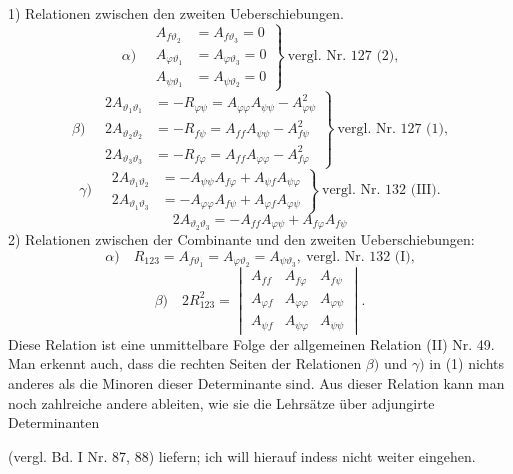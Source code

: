 1) Relationen zwischen den zweiten Ueberschiebungen.
\[
\alpha)\quad
\left.\begin{aligned}
A_{f\vartheta_2} &= A_{f\vartheta_3} = 0\\
A_{\varphi\vartheta_1} &= A_{\varphi\vartheta_3} = 0\\
A_{\psi\vartheta_1} &= A_{\psi\vartheta_2} = 0 %
\end{aligned}\right\}\ \text{vergl. Nr. 127 (2),}
\]
\[
\beta)\quad
\left.\begin{aligned}
2A_{\vartheta_1\vartheta_1} &= -R_{\varphi\psi} = A_{\varphi\varphi}A_{\psi\psi}-A_{\varphi\psi}^2\\
2A_{\vartheta_2\vartheta_2} &= -R_{f\psi} = A_{ff}A_{\psi\psi}-A_{f\psi}^2\\
2A_{\vartheta_3\vartheta_3} &= -R_{f\varphi} = A_{ff}A_{\varphi\varphi}-A_{f\varphi}^2
\end{aligned}\right\}\ \text{vergl. Nr. 127 (1),}
\]
\[
\gamma)\quad
\left.\begin{aligned}
2A_{\vartheta_1\vartheta_2} &= -A_{\psi\psi}A_{f\varphi}+A_{\psi f}A_{\psi\varphi}\\
2A_{\vartheta_1\vartheta_3} &= -A_{\varphi\varphi}A_{f\psi}+A_{\varphi f}A_{\varphi\psi}
\end{aligned}\right\}\ \text{vergl. Nr. 132 (III).}
\]
\[
2A_{\vartheta_2\vartheta_3} = -A_{ff}A_{\varphi\psi}+A_{f\varphi}A_{f\psi}
\]
2) Relationen zwischen der Combinante und den zweiten Ueberschiebungen:
\[
\alpha)\quad R_{123}=A_{f\vartheta_1}=A_{\varphi\vartheta_2}=A_{\psi\vartheta_3},\ \text{vergl. Nr. 132 (I),}
\]
\[
\beta)\quad 2R_{123}^2=
\begin{vmatrix}
A_{ff} & A_{f\varphi} & A_{f\psi}\\
A_{\varphi f} & A_{\varphi\varphi} & A_{\varphi\psi}\\
A_{\psi f} & A_{\psi\varphi} & A_{\psi\psi}
\end{vmatrix}.
\]
Diese Relation ist eine unmittelbare Folge der allgemeinen Relation (II) Nr. 49. Man erkennt auch, dass die rechten Seiten der Relationen $\beta)$ und $\gamma)$ in (1) nichts anderes als die Minoren dieser Determinante sind. Aus dieser Relation kann man noch zahlreiche andere ableiten, wie sie die Lehrs\"atze \"uber adjungirte Determinanten


(vergl. Bd. I Nr. 87, 88) liefern; ich will hierauf indess nicht weiter eingehen.

